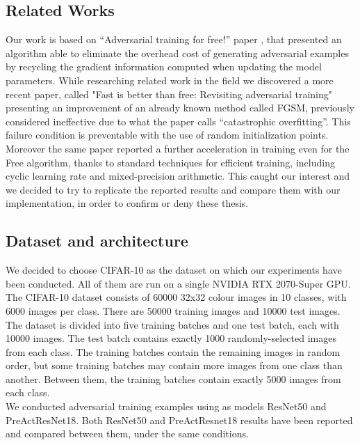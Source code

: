 \documentclass{article}
\begin{document}
\subsection{Related Works}
Our work is based on “Adversarial training for free!” paper
\cite{ShafahiEtAl2019b}, that presented an algorithm able to eliminate the
overhead cost of generating adversarial examples by recycling the gradient
information computed when updating the model parameters. While researching
related work in the field we discovered a more recent paper, called "Fast is
better than free: Revisiting adversarial training" \cite{WongEtAl2020}
presenting an improvement of an already known method called FGSM, previously
considered ineffective due to what the paper calls “catastrophic overfitting”.
This failure condition is preventable with the use of random initialization
points. Moreover the same paper reported a further acceleration in training even
for the Free algorithm, thanks to standard techniques for efficient training,
including cyclic learning rate and mixed-precision arithmetic. This caught our
interest and we decided to try to replicate the reported results and compare
them with our implementation, in order to confirm or deny these thesis.

\subsection{Dataset and architecture}

We decided to choose CIFAR-10 as the dataset on which our experiments have been
conducted. All of them are run on a single NVIDIA RTX 2070-Super GPU.\\
The CIFAR-10 dataset consists of 60000 32x32 colour images in 10 classes, with
6000 images per class. There are 50000 training images and 10000 test images.
The dataset is divided into five training batches and one test batch, each with
10000 images. The test batch contains exactly 1000 randomly-selected images from
each class. The training batches contain the remaining images in random order,
but some training batches may contain more images from one class than another.
Between them, the training batches contain exactly 5000 images from each
class.\\
We conducted adversarial training examples using as models ResNet50 and
PreActResNet18. Both ResNet50 and PreActResnet18 results have been reported and
compared between them, under the same conditions. 
\end{document}
